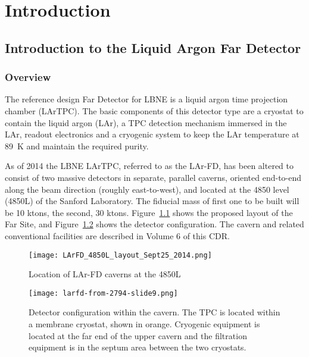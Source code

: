 \chapter{Introduction}


\section{Introduction to the Liquid Argon Far Detector}
\label{ch:detector}

\subsection{Overview}

The reference design Far Detector for LBNE is a liquid argon time projection chamber (LArTPC). 
The basic components of this detector type are a cryostat to contain the liquid argon (LAr), 
a TPC detection mechanism immersed in the LAr, readout electronics and
a cryogenic system to keep the LAr temperature at 89~K and maintain the required purity. 


As of 2014 the LBNE LArTPC, referred to as the LAr-FD, has been altered to consist of two massive detectors in
separate, parallel caverns, oriented end-to-end along the beam direction (roughly east-to-west), and located at the 4850 level (4850L) of the Sanford Laboratory. The fiducial mass of first one to be built will be 10 ktons, the second, 30 ktons. 
Figure~\ref{fig:cavern-layout-2014} %
shows the proposed
layout of the Far Site, and Figure~\ref{fig:LAr-FD-config-cavern} shows the detector configuration.  The cavern and related conventional facilities are described in Volume 6 of this CDR.

\begin{figure}[htbp]
\centering
\texttt{[image: LArFD\_4850L\_layout\_Sept25\_2014.png]}
\caption[Location of LAr-FD caverns at the 4850L]{Location of LAr-FD caverns at the 4850L} %
\label{fig:cavern-layout-2014}
\end{figure}


\begin{figure}[htbp]
\centering
\texttt{[image: larfd-from-2794-slide9.png]}
\caption[Detector configuration within the cavern]{Detector configuration within the cavern. The TPC is located within a membrane cryostat, shown in orange. 
Cryogenic equipment is located at the far end of the upper cavern and the filtration equipment is in the septum area between the two cryostats. }
\label{fig:LAr-FD-config-cavern}
\end{figure}

